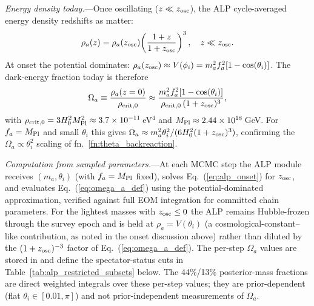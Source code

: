 \documentclass[aps,prd,twocolumn,superscriptaddress,showpacs,preprintnumbers,nofootinbib,longbibliography,floatfix]{revtex4-2}
\newcommand{\MPl}{M_{\rm Pl}}
\begin{document}
\textit{Energy density today.}---Once oscillating ($z \ll z_{\rm osc}$),
the ALP cycle-averaged energy density redshifts as matter:
\begin{equation}
\rho_a(z) = \rho_a(z_{\rm osc})\!\left(\frac{1+z}{1+z_{\rm osc}}\right)^3, \quad z \ll z_{\rm osc}.
\label{eq:rho_a_evol}
\end{equation}
At onset the potential dominates: $\rho_a(z_{\rm osc}) \approx V(\phi_i)
= m_a^2 f_a^2[1-\cos(\theta_i)]$. The dark-energy fraction today is therefore
\begin{equation}
\Omega_a \equiv \frac{\rho_a(z=0)}{\rho_{\rm crit,0}}
\approx \frac{m_a^2 f_a^2[1-\cos(\theta_i)]}{\rho_{\rm crit,0}\,(1+z_{\rm osc})^3},
\label{eq:omega_a_def}
\end{equation}
with $\rho_{\rm crit,0} = 3H_0^2\MPl^2 \approx 3.7\times10^{-11}$\,eV$^4$
and $\MPl \approx 2.44\times10^{18}$\,GeV. For $f_a = \MPl$ and small $\theta_i$
this gives $\Omega_a \approx m_a^2\theta_i^2/(6H_0^2(1+z_{\rm osc})^3)$,
confirming the $\Omega_a \propto \theta_i^2$ scaling of fn.~\ref{fn:theta_backreaction}.

\textit{Computation from sampled parameters.}---At each MCMC step the ALP module
receives $(m_a, \theta_i)$ (with $f_a = \MPl$ fixed), solves
Eq.~(\ref{eq:alp_onset}) for $z_{\rm osc}$, and evaluates
Eq.~(\ref{eq:omega_a_def}) using the potential-dominated approximation,
verified against full EOM integration for committed chain parameters.
For the lightest masses with $z_{\rm osc}\le 0$ the ALP remains Hubble-frozen
through the survey epoch and is held at $\rho_a = V(\theta_i)$ (a
cosmological-constant--like contribution, as noted in the onset discussion
above) rather than diluted by the $(1+z_{\rm osc})^{-3}$ factor of
Eq.~(\ref{eq:omega_a_def}).
The per-step $\Omega_a$ values are stored in
and define the spectator-status cuts in Table~\ref{tab:alp_restricted_subsets} below.
The 44\%/13\% posterior-mass fractions are direct weighted integrals over
these per-step values; they are prior-dependent (flat $\theta_i\in[0.01,\pi]$)
and not prior-independent measurements of $\Omega_a$.
\end{document}
